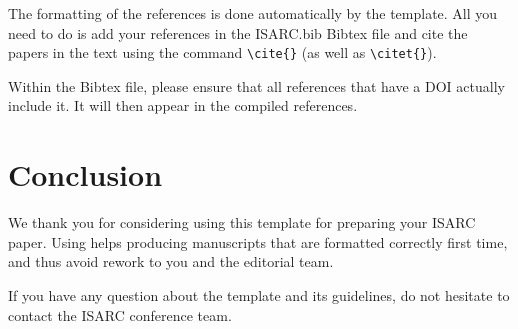 \documentclass[a4paper, times, 10pt, twocolumn, twoside]{article}
\begin{document}
The formatting of the references is done automatically by the  template.
All you need to do is add your references in the ISARC.bib Bibtex file and cite the papers in the text using the command \verb|\cite{}| (as well as \verb|\citet{}|).

Within the Bibtex file, please ensure that all references that have a DOI actually include it. It will then appear in the compiled references.



\section{Conclusion}
\label{sec:Conclusion}

We thank you for considering using this  template for preparing your ISARC paper. 
Using  helps producing manuscripts that are formatted correctly first time, and thus avoid rework to you and the editorial team. 

If you have any question about the template and its guidelines, do not hesitate to contact the ISARC conference team.



\end{document}
